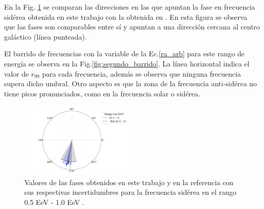 En la Fig. \ref{fig:segundo} se comparan las direcciones en las que apuntan la fase en frecuencia sidérea obtenida en este trabajo con la obtenida en \cite{Aab_2020}. En esta figura se observa que las fases son comparables entre sí y apuntan a una dirección cercana al centro galáctico (línea punteada).

El barrido de frecuencias con la variable de la Ec.\ref{ra_arb} para este rango de energía se observa en la Fig.\ref{fig:segundo_barrido}. La línea horizontal indica el valor de $r_{99}$ para cada frecuencia, además se observa que ninguna frecuencia supera dicho umbral. Otro aspecto es que la zona de la frecuencia anti-sidérea no tiene picos pronunciados, como en la frecuencia solar o sidérea.

\begin{figure}[H]
    \begin{small}
        \begin{center}
            \includegraphics[width=0.485\textwidth]{phase_segundo_bin.pdf}
        \end{center}
        \caption{Valores de las fases obtenidos en este trabajo y en la referencia con sus respectivas incertidumbres para la frecuencia sidérea en el  rango 0.5 EeV - 1.0 EeV .}
        \label{fig:segundo}
    \end{small}
\end{figure}

